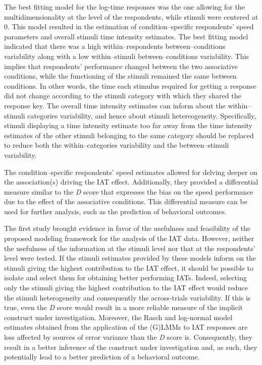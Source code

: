 \documentclass[12pt]{book}
\begin{document}
The best fitting model for the log-time responses was the one allowing for the multidimensionality at the level of the respondents, while stimuli were centered at 0. 
This model resulted in the estimation of condition--specific respondents’ speed parameters and overall stimuli time intensity estimates. 
The best fitting model indicated that there was a high within--respondents between--conditions variability along with a low within--stimuli between--conditions variability.
This implies that respondents' performance changed between the two associative conditions, while the functioning of the stimuli remained the same between conditions.
In other words, the time each stimulus required for getting a response did not change according to the stimuli category with which they shared the response key.
The overall time intensity estimates can inform about the within--stimuli categories variability, and hence about stimuli hetereogeneity. 
Specifically, stimuli displaying a time intensity estimate too far away from the time intensity estimates of the other stimuli belonging to the same category should be replaced to reduce both the within--categories variability and the between--stimuli variability.

The condition--specific respondents' speed estimates allowed for delving deeper on the association(s) driving the IAT effect. Additionally, they provided a differential measure similar to the \emph{D} score that expresses the bias on the speed performance due to the effect of the associative conditions. 
 This differential measure can be used for further analysis, such as the prediction of behavioral outcomes. 
 
The first study brought evidence in favor of the usefulness and feasibility of the proposed  modeling framework for the analysis of the IAT data.
However, neither the usefulness of the information at the stimuli level nor that at the respondents’ level were tested. 
If the stimuli estimates provided by these models inform on the stimuli giving the highest contribution to the IAT effect, it should be possible to isolate and select them for obtaining better performing IATs. 
Indeed, selecting only the stimuli giving the highest contribution to the IAT effect would reduce the stimuli heterogeneity and consequently the across-trials variability. If this is true, even the \emph{D} score would result in a more reliable measure of the implicit construct under investigation. 
Moreover, the Rasch and log-normal model estimates obtained from the application of the (G)LMMs to IAT responses are less affected by sources of error variance than the \emph{D} score is. 
Consequently, they result in a better inference of the construct under investigation and, as such, they potentially lead to a better prediction of a behavioral outcome.
\end{document}
